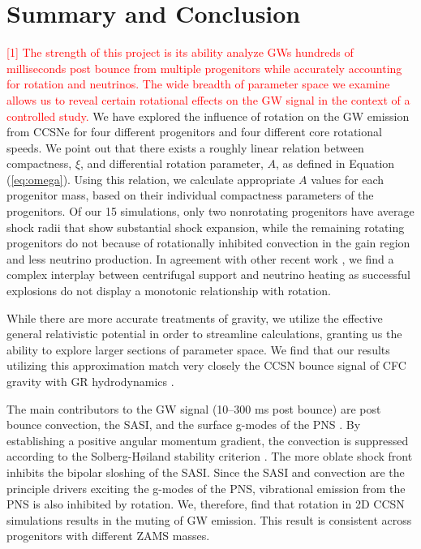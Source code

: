 \documentclass[twocolumn,times]{aastex62}  %
\begin{document}



\section{Summary and Conclusion}
\label{sec:summary}

\textcolor{red}{[1] The strength of this project is its ability analyze GWs hundreds of milliseconds post bounce from multiple progenitors while accurately accounting for rotation and neutrinos.  The wide breadth of parameter space we examine allows us to reveal certain rotational effects on the GW signal in the context of a controlled study.}  We have explored the influence of rotation on the GW emission from CCSNe for four different progenitors and four different core rotational speeds.  
We point out that there exists a roughly linear relation between compactness, $\xi$, and differential rotation parameter, $A$, as defined in Equation (\ref{eq:omega}). 
Using this relation, we calculate appropriate $A$ values for each progenitor mass, based on their individual compactness parameters of the \citet{Suk:2016} progenitors.  Of our 15 simulations, only two nonrotating progenitors have average shock radii that show substantial shock expansion, while the remaining rotating progenitors do not because of rotationally inhibited convection in the gain region and less neutrino production.  In agreement with other recent work \citep[e.g.,][]{summa:2018}, we find a complex interplay between centrifugal support and neutrino heating as successful explosions do not display a monotonic relationship with rotation.

While there are more accurate treatments of gravity, we utilize the effective general relativistic potential in order to streamline calculations, granting us the ability to explore larger sections of parameter space. 
We find that our results utilizing this approximation match very closely the CCSN bounce signal of CFC gravity with GR hydrodynamics \citep{richers:2017}.  

The main contributors to the GW signal (10--300 ms post bounce) are post bounce convection, the SASI, and the surface g-modes of the PNS \citep{moro:2018}.  By establishing a positive angular momentum gradient, the convection is suppressed according to the Solberg-H{\o}iland stability criterion \citep{endal:1978,fryer:2000}.  The more oblate shock front inhibits the bipolar sloshing of the SASI.  Since the SASI and convection are the principle drivers exciting the g-modes of the PNS, vibrational emission from the PNS is also inhibited by rotation.  
We, therefore, find that rotation in 2D CCSN simulations results in the muting of GW emission.
This result is consistent across progenitors with different ZAMS masses. 
\end{document}
